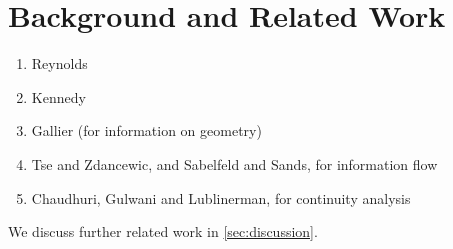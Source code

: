 \section{Background and Related Work}
\label{sec:background}

\begin{enumerate}
\item Reynolds \cite{reynolds83types}
\item Kennedy \cite{kennedy97relational}
\item Gallier (for information on geometry) \cite{gallier11geometric}
\item Tse and Zdancewic, and Sabelfeld and Sands, for information flow \cite{sabelfeld01per}
\item Chaudhuri, Gulwani and Lublinerman, for continuity analysis \cite{chaudhuri10continuity}
\end{enumerate}

We discuss further related work in \autoref{sec:discussion}.

